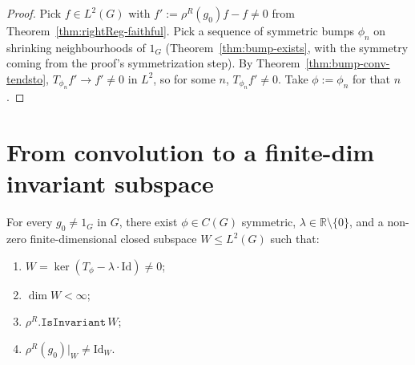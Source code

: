 \begin{proof}
  Pick $f \in L^2(G)$ with $f' := \rho^R(g_0) f - f \neq 0$ from
  Theorem~\ref{thm:rightReg-faithful}. Pick a sequence of symmetric
  bumps $\phi_n$ on shrinking neighbourhoods of $1_G$
  (Theorem~\ref{thm:bump-exists}, with the symmetry coming from the
  proof's symmetrization step). By
  Theorem~\ref{thm:bump-conv-tendsto}, $T_{\phi_n} f' \to f' \neq 0$
  in $L^2$, so for some $n$, $T_{\phi_n} f' \neq 0$. Take $\phi := \phi_n$
  for that $n$.
\end{proof}

\section{From convolution to a finite-dim invariant subspace}

\begin{theorem}
  \label{thm:eigenspace-separates}
  For every $g_0 \neq 1_G$ in $G$, there exist $\phi \in C(G)$ symmetric,
  $\lambda \in \mathbb R \setminus \{0\}$, and a non-zero
  finite-dimensional closed subspace $W \leq L^2(G)$ such that:
  \begin{enumerate}
    \item $W = \ker(T_\phi - \lambda \cdot \mathrm{Id}) \neq 0$;
    \item $\dim W < \infty$;
    \item $\rho^R.\texttt{IsInvariant}\,W$;
    \item $\rho^R(g_0)|_W \neq \mathrm{Id}_W$.
  \end{enumerate}
\end{theorem}

